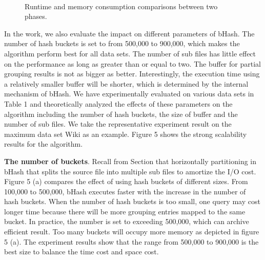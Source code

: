 \begin{figure}%
    \centering
    \ \
    \hspace{1pt}
    \ \
    \caption{Runtime and memory consumption comparisons between two phases.}\label{fig:Phase evaluation}
\end{figure}


In the work, we also evaluate the impact on different parameters of bHash. The number of hash buckets is set to from 500,000 to 900,000, which makes the algorithm perform best for all data sets. The number of sub files has little effect on the performance as long as greater than or equal to two. The buffer for partial grouping results is not as bigger as better. Interestingly, the execution time using a relatively smaller buffer will be shorter, which is determined by the internal mechanism of bHash. We have experimentally evaluated on various data sets in Table 1 and theoretically analyzed the effects of these parameters on the algorithm including the number of hash buckets, the size of buffer and the number of sub files. We take the representative experiment result on the maximum data set Wiki as an example. Figure 5 shows the strong scalability results for the algorithm.

\textbf{The number of buckets}. Recall from Section \uppercase\expandafter{\romannumeral3} that horizontally partitioning in bHash that splits the source file into multiple sub files to amortize the I/O cost. Figure 5 (a) compares the effect of using hash buckets of different sizes. From 100,000 to 500,000, bHash executes faster with the increase in the number of hash buckets. When the number of hash buckets is too small, one query may cost longer time because there will be more grouping entries mapped to the same bucket. In practice, the number is set to exceeding 500,000, which can archive efficient result. Too many buckets will occupy more memory as depicted in figure 5 (a). The experiment results show that the range from 500,000 to 900,000 is the best size to balance the time cost and space cost.

